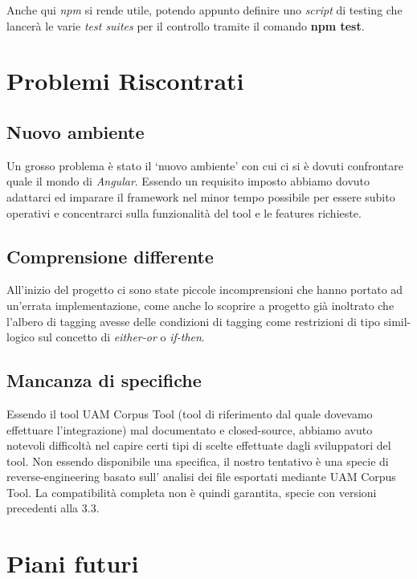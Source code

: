 \documentclass[twoside]{supsistudent}
\begin{document}
Anche qui \textit{npm} si rende utile, potendo appunto definire uno
\textit{script} di testing che lancerà le varie \textit{test suites} per il
controllo tramite il comando \textbf{npm test}.

\chapter{Problemi Riscontrati}

\section{Nuovo ambiente}

Un grosso problema è stato il `nuovo ambiente' con cui ci si è dovuti 
confrontare quale il mondo di \textit{Angular}. Essendo un requisito imposto
abbiamo dovuto adattarci ed imparare il framework nel minor tempo possibile
per essere subito operativi e concentrarci sulla funzionalità del tool e le
features richieste.

\section{Comprensione differente}

All'inizio del progetto ci sono state piccole incomprensioni che hanno portato
ad un'errata implementazione, come anche lo scoprire a progetto già inoltrato
che l'albero di tagging avesse delle condizioni di tagging come restrizioni
di tipo simil-logico sul concetto di \textit{either-or} o \textit{if-then}.

\section{Mancanza di specifiche}

Essendo il tool UAM Corpus Tool (tool di riferimento dal quale dovevamo
effettuare l'integrazione) mal documentato e closed-source, abbiamo avuto
notevoli difficoltà nel capire certi tipi di scelte effettuate dagli
sviluppatori del tool. Non essendo disponibile una specifica, 
il nostro tentativo è una specie di reverse-engineering basato sull'
analisi dei file esportati mediante UAM Corpus Tool. La compatibilità
completa non è quindi garantita, specie con versioni precedenti alla 3.3.

\chapter{Piani futuri}
\end{document}
